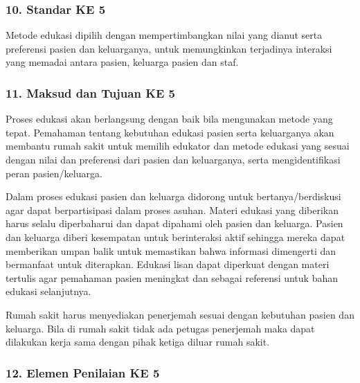 \documentclass[
]{book}
\begin{document}
\hypertarget{standar-ke-5}{%
\subsubsection*{10. Standar KE 5}\label{standar-ke-5}}

Metode edukasi dipilih dengan mempertimbangkan nilai yang dianut serta preferensi pasien dan keluarganya, untuk memungkinkan terjadinya interaksi yang memadai antara pasien, keluarga pasien dan staf.

\hypertarget{maksud-dan-tujuan-ke-5}{%
\subsubsection*{11. Maksud dan Tujuan KE 5}\label{maksud-dan-tujuan-ke-5}}

Proses edukasi akan berlangsung dengan baik bila mengunakan metode yang tepat. Pemahaman tentang kebutuhan edukasi pasien serta keluarganya akan membantu rumah sakit untuk memilih edukator dan metode edukasi yang sesuai dengan nilai dan preferensi dari pasien dan keluarganya, serta mengidentifikasi peran pasien/keluarga.

Dalam proses edukasi pasien dan keluarga didorong untuk bertanya/berdiskusi agar dapat berpartisipasi dalam proses asuhan. Materi edukasi yang diberikan harus selalu diperbaharui dan dapat dipahami oleh pasien dan keluarga. Pasien dan keluarga diberi kesempatan untuk berinteraksi aktif sehingga mereka dapat memberikan umpan balik untuk memastikan bahwa informasi dimengerti dan bermanfaat untuk diterapkan. Edukasi lisan dapat diperkuat dengan materi tertulis agar pemahaman pasien meningkat dan sebagai referensi untuk bahan edukasi selanjutnya.

Rumah sakit harus menyediakan penerjemah sesuai dengan kebutuhan pasien dan keluarga. Bila di rumah sakit tidak ada petugas penerjemah maka dapat dilakukan kerja sama dengan pihak ketiga diluar rumah sakit.

\hypertarget{elemen-penilaian-ke-5}{%
\subsubsection*{12. Elemen Penilaian KE 5}\label{elemen-penilaian-ke-5}}
\end{document}
